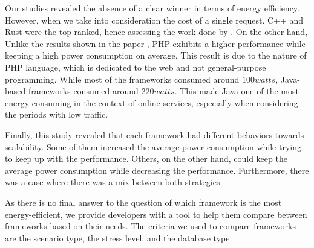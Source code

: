 Our studies revealed the absence of a clear winner in terms of energy efficiency.
However, when we take into consideration the cost of a single request.
C++ and Rust were the top-ranked, hence assessing the work done by \citeauthor{pereira_energy_2017}.
On the other hand, Unlike the results shown in the paper \cite{pereira_energy_2017}, \textsf{PHP} exhibits a higher performance while keeping a high power consumption on average.
This result is due to the nature of \textsf{PHP} language, which is dedicated to the web and not general-purpose programming.
While most of the frameworks consumed around $100 watts$, \textsf{Java}-based frameworks consumed around $220 watts$.
This made \textsf{Java} one of the most energy-consuming in the context of online services, especially when considering the periods with low traffic.

Finally, this study revealed that each framework had different behaviors towards scalability.
Some of them increased the average power consumption while trying to keep up with the performance.
Others, on the other hand, could keep the average power consumption while decreasing the performance.
Furthermore, there was a case where there was a mix between both strategies.

As there is no final answer to the question of which framework is the most energy-efficient, we provide developers with a tool to help them compare between frameworks based on their needs.
The criteria we used to compare frameworks are the scenario type, the stress level, and the database type.

